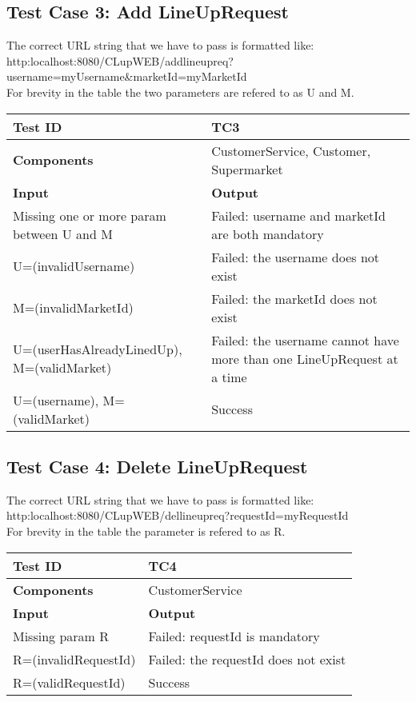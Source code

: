 \subsection{Test Case 3: Add LineUpRequest}
The correct URL string that we have to pass is formatted like: \\
{\footnotesize http:localhost:8080/CLupWEB/addlineupreq?username=myUsername\&marketId=myMarketId} \\
For brevity in the table the two parameters are refered to as U and M.
\begin{center}
    \begin{tabular}{ |  p{8cm} | p{8cm} |}
    \hline
     \textbf{Test ID}  & TC3 \\ \hline
     \textbf{Components}  & CustomerService, Customer, Supermarket\\ \hline
    \textbf{Input} & \textbf{Output}  \\ \hline
    Missing one or more param between U and M & Failed: username and marketId are both mandatory   \\ \hline
    U=(invalidUsername) & Failed: the username does not exist \\ \hline	
    M=(invalidMarketId) & Failed: the marketId does not exist \\ \hline
    U=(userHasAlreadyLinedUp), M=(validMarket) & Failed: the username cannot have more than one LineUpRequest at a time\\ \hline	
    U=(username), M=(validMarket) & Success\\ \hline	
    \end{tabular}
\end{center}




\subsection{Test Case 4: Delete LineUpRequest}
The correct URL string that we have to pass is formatted like: \\
{\footnotesize http:localhost:8080/CLupWEB/dellineupreq?requestId=myRequestId} \\
For brevity in the table the parameter is refered to as R.
\begin{center}
    \begin{tabular}{ |  p{8cm} | p{8cm} |}
    \hline
     \textbf{Test ID}  & TC4 \\ \hline
     \textbf{Components}  & CustomerService\\ \hline
    \textbf{Input} & \textbf{Output}  \\ \hline
    Missing param R & Failed: requestId is mandatory   \\ \hline
    R=(invalidRequestId) & Failed: the requestId does not exist \\ \hline	
    R=(validRequestId) & Success \\ \hline	
    \end{tabular}
\end{center}


